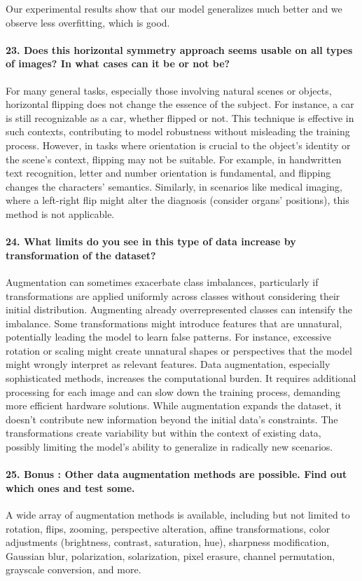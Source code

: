 \documentclass{article}
\theoremstyle{plain}%
\theoremstyle{definition}
\theoremstyle{remark}
\begin{document}
Our experimental results show that our model generalizes much better and we observe less overfitting, which is good.

\paragraph{23. Does this horizontal symmetry approach seems usable on all types of images? In what cases can it be or not be?}
For many general tasks, especially those involving natural scenes or objects, horizontal flipping does not change the essence of the subject. For instance, a car is still recognizable as a car, whether flipped or not. This technique is effective in such contexts, contributing to model robustness without misleading the training process. However, in tasks where orientation is crucial to the object's identity or the scene's context, flipping may not be suitable. For example, in handwritten text recognition, letter and number orientation is fundamental, and flipping changes the characters' semantics. Similarly, in scenarios like medical imaging, where a left-right flip might alter the diagnosis (consider organs' positions), this method is not applicable.

\paragraph{24. What limits do you see in this type of data increase by transformation of the dataset?}
Augmentation can sometimes exacerbate class imbalances, particularly if transformations are applied uniformly across classes without considering their initial distribution. Augmenting already overrepresented classes can intensify the imbalance. Some transformations might introduce features that are unnatural, potentially leading the model to learn false patterns. For instance, excessive rotation or scaling might create unnatural shapes or perspectives that the model might wrongly interpret as relevant features. Data augmentation, especially sophisticated methods, increases the computational burden. It requires additional processing for each image and can slow down the training process, demanding more efficient hardware solutions. While augmentation expands the dataset, it doesn't contribute new information beyond the initial data's constraints. The transformations create variability but within the context of existing data, possibly limiting the model's ability to generalize in radically new scenarios.

\paragraph{25. Bonus : Other data augmentation methods are possible. Find out which ones and test some.}
A wide array of augmentation methods is available, including but not limited to rotation, flips, zooming, perspective alteration, affine transformations, color adjustments (brightness, contrast, saturation, hue), sharpness modification, Gaussian blur, polarization, solarization, pixel erasure, channel permutation, grayscale conversion, and more.
\end{document}

